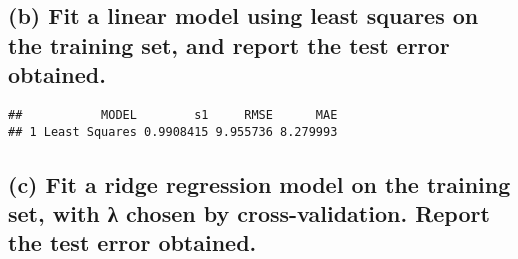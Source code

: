\documentclass[
]{article}
\newenvironment{Shaded}{\begin{snugshade}}{\end{snugshade}}
\newcommand{\AttributeTok}[1]{\textcolor[rgb]{0.77,0.63,0.00}{#1}}
\newcommand{\CommentTok}[1]{\textcolor[rgb]{0.56,0.35,0.01}{\textit{#1}}}
\newcommand{\FunctionTok}[1]{\textcolor[rgb]{0.00,0.00,0.00}{#1}}
\newcommand{\NormalTok}[1]{#1}
\newcommand{\OtherTok}[1]{\textcolor[rgb]{0.56,0.35,0.01}{#1}}
\newcommand{\SpecialCharTok}[1]{\textcolor[rgb]{0.00,0.00,0.00}{#1}}
\newcommand{\StringTok}[1]{\textcolor[rgb]{0.31,0.60,0.02}{#1}}
\begin{document}
\hypertarget{b-fit-a-linear-model-using-least-squares-on-the-training-set-and-report-the-test-error-obtained.}{%
\subsection{(b) Fit a linear model using least squares on the training
set, and report the test error
obtained.}\label{b-fit-a-linear-model-using-least-squares-on-the-training-set-and-report-the-test-error-obtained.}}

\begin{Shaded}
\end{Shaded}

\begin{verbatim}
##           MODEL        s1     RMSE      MAE
## 1 Least Squares 0.9908415 9.955736 8.279993
\end{verbatim}

\hypertarget{c-fit-a-ridge-regression-model-on-the-training-set-with-ux3bb-chosen-by-cross-validation.-report-the-test-error-obtained.}{%
\subsection{(c) Fit a ridge regression model on the training set, with λ
chosen by cross-validation. Report the test error
obtained.}\label{c-fit-a-ridge-regression-model-on-the-training-set-with-ux3bb-chosen-by-cross-validation.-report-the-test-error-obtained.}}
\end{document}
